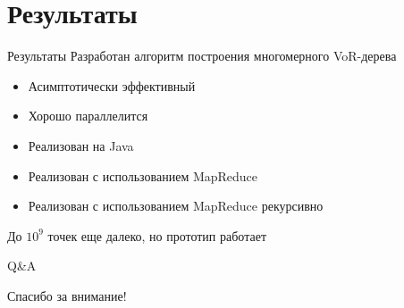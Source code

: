 \documentclass[14pt, fleqn, xcolor={dvipsnames, table}]{beamer}
\begin{document}
    \section{Результаты}
    
        \begin{frame}{Результаты}
            Разработан алгоритм построения многомерного VoR-дерева
            \begin{itemize}
                \item Асимптотически эффективный 
                \item Хорошо параллелится
                \item Реализован на Java
                \item Реализован с использованием MapReduce
                \item Реализован с использованием MapReduce рекурсивно
            \end{itemize}
            До $10^9$ точек еще далеко, но прототип работает
        \end{frame}
        
        \begin{frame}{Q\&A}
            \begin{center}
                Спасибо за внимание!
            \end{center}
        \end{frame}
        
        
        

    
        
        
\end{document}
